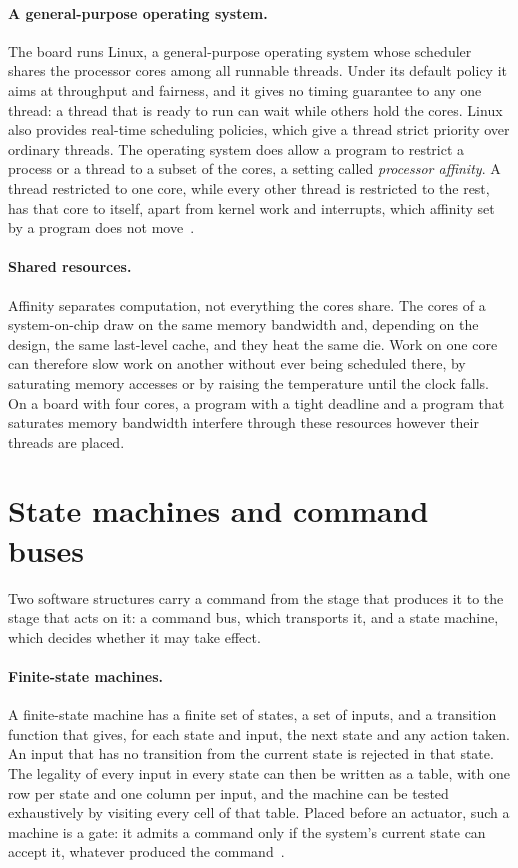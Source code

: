 \paragraph{A general-purpose operating system.} The board runs Linux, a general-purpose operating
system whose scheduler shares the processor cores among all runnable threads. Under its default
policy it aims at throughput and fairness, and it gives no timing guarantee to any one thread: a
thread that is ready to run can wait while others hold the cores. Linux also provides real-time
scheduling policies, which give a thread strict priority over ordinary threads. The operating system
does allow a program to restrict a process or a thread to a subset of the cores, a setting called
\emph{processor affinity}. A thread restricted to one core, while every other thread is restricted
to the rest, has that core to itself, apart from kernel work and interrupts, which affinity set by a
program does not move~\cite{love2010}.

\paragraph{Shared resources.} Affinity separates computation, not everything the cores share. The
cores of a system-on-chip draw on the same memory bandwidth and, depending on the design, the same
last-level cache, and they heat the same die. Work on one core can therefore slow work on another
without ever being scheduled there, by saturating memory accesses or by raising the temperature
until the clock falls. On a board with four cores, a program with a tight deadline and a program
that saturates memory bandwidth interfere through these resources however their threads are
placed.

\noautobreak
\section{State machines and command buses}
\label{sec:bg-fsm}
Two software structures carry a command from the stage that produces it to the stage that acts on
it: a command bus, which transports it, and a state machine, which decides whether it may take
effect.

\paragraph{Finite-state machines.} A finite-state machine has a finite set of states, a set of
inputs, and a transition function that gives, for each state and input, the next state and any
action taken. An input that has no transition from the current state is rejected in that state.
The legality of every input in every state can then be written as a table, with one row per state
and one column per input, and the machine can be tested exhaustively by visiting every cell of that
table. Placed before an actuator, such a machine is a gate: it admits a command only if the system's
current state can accept it, whatever produced the command~\cite{harel1987}.


